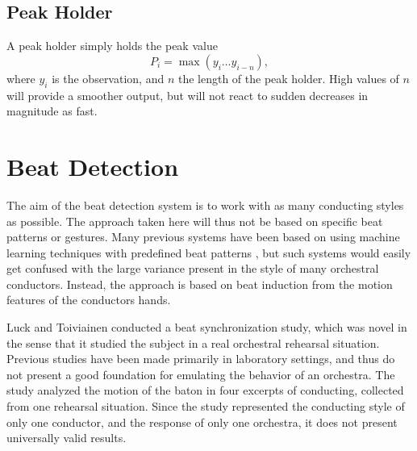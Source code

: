 \subsection{Peak Holder}

A peak holder simply holds the peak value
\begin{equation}
P_i = \max \left( y_i \ldots y_{i - n} \right),
\end{equation}
where $y_i$ is the \nth[i] observation,
and $n$ the length of the peak holder.
High values of $n$ will provide a smoother output,
but will not react to sudden decreases in magnitude as fast.

\section{Beat Detection}
\label{sec:beat_detection}

The aim of the beat detection system is
to work with as many conducting styles as possible.
The approach taken here will thus not be
based on specific beat patterns or gestures.
Many previous systems have been based on
using machine learning techniques with
predefined beat patterns \cite{},
but such systems would easily get confused with
the large variance present in the style of
many orchestral conductors.
Instead, the approach is based on beat induction
from the motion features of the conductors hands.

Luck and Toiviainen \cite{luck2006}
conducted a beat synchronization study,
which was novel in the sense that it studied
the subject in a real orchestral rehearsal situation.
Previous studies have been made primarily in laboratory settings,
and thus do not present a good foundation
for emulating the behavior of an orchestra.
The study analyzed the motion of the baton
in four excerpts of conducting,
collected from one rehearsal situation.
Since the study represented the conducting style of only one conductor,
and the response of only one orchestra,
it does not present universally valid results.


